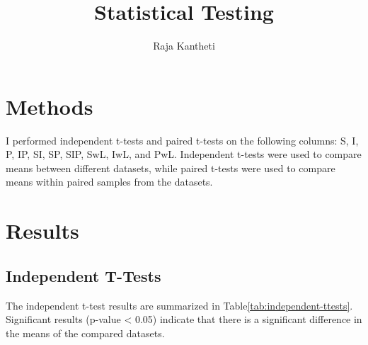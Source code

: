\documentclass{article}
\title{Statistical Testing}
\author{Raja Kantheti}
\begin{document}
\maketitle
\section{Methods}
I performed independent t-tests and paired t-tests on the following columns: S, I, P, IP, SI, SP, SIP, SwL, IwL, and PwL. Independent t-tests were used to compare means between different datasets, while paired t-tests were used to compare means within paired samples from the datasets.

\section{Results}

\subsection{Independent T-Tests}
The independent t-test results are summarized in Table\ref{tab:independent-ttests}. Significant results (p-value < 0.05) indicate that there is a significant difference in the means of the compared datasets.
\end{document}
